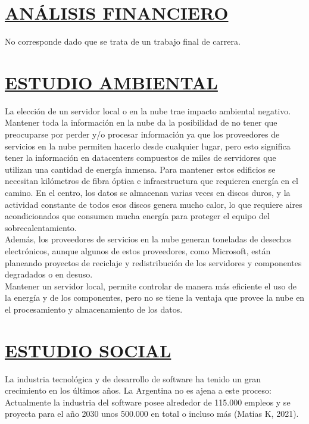 \section*{\underline{ANÁLISIS FINANCIERO}}
No corresponde dado que se trata de un trabajo final de carrera.\\

\section*{\underline{ESTUDIO AMBIENTAL}}
La elección de un servidor local o en la nube trae impacto ambiental negativo.\\

Mantener toda la información en la nube da la posibilidad de no tener que preocuparse por perder y/o procesar información ya que los proveedores de servicios en la nube permiten hacerlo desde cualquier lugar, pero esto significa tener la información en datacenters compuestos de miles de servidores que utilizan una cantidad de energía inmensa. Para mantener estos edificios se necesitan kilómetros de fibra óptica e infraestructura que requieren energía en el camino. En el centro, los datos se almacenan varias veces en discos duros, y la actividad constante de todos esos discos genera mucho calor, lo que requiere aires acondicionados que consumen mucha energía para proteger el equipo del sobrecalentamiento.\\
Además, los proveedores de servicios en la nube generan toneladas de desechos electrónicos, aunque algunos de estos proveedores, como Microsoft, están planeando proyectos de reciclaje y redistribución de los servidores y componentes degradados o en desuso.
\\

Mantener un servidor local, permite controlar de manera más eficiente el uso de la energía y de los componentes, pero no se tiene la ventaja que provee la nube en el procesamiento y almacenamiento de los datos.\\




\section*{\underline{ESTUDIO SOCIAL}}
La industria tecnológica y de desarrollo de software ha tenido un gran crecimiento en los últimos años. La Argentina no es ajena a este proceso: Actualmente la industria del software posee alrededor de 115.000 empleos y se proyecta para el año 2030 unos 500.000 en total o incluso más \textbf{\cite{EmpleosUltAnios}}(Matias K, 2021).\\

